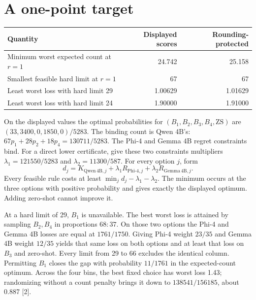 \documentclass[11pt]{article}
\begin{document}
\newpage
\section{A one-point target}
\begin{center}\small
\begin{tabular}{lrr}
\toprule
Quantity & Displayed scores & Rounding-protected\\\midrule
Minimum worst expected count at $r=1$ & 24.742 & 25.158\\
Smallest feasible hard limit at $r=1$ & 67 & 67\\
Least worst loss with hard limit 29 & 1.00629 & 1.01629\\
Least worst loss with hard limit 24 & 1.90000 & 1.91000\\
\bottomrule
\end{tabular}
\end{center}
On the displayed values the optimal probabilities for $(B_1,B_2,B_3,B_4,\mathrm{ZS})$ are $(33,3400,0,1850,0)/5283$. The binding count is Qwen 4B's: $67p_1+28p_2+18p_4=130711/5283$. The Phi-4 and Gemma 4B regret constraints bind. For a direct lower certificate, give these two constraints multipliers $\lambda_1=121550/5283$ and $\lambda_2=11300/587$. For every option $j$, form
\[
 d_j=K_{\mathrm{Qwen\,4B},j}+\lambda_1 R_{\mathrm{Phi\text{-}4},j}
                              +\lambda_2 R_{\mathrm{Gemma\,4B},j}.
\]
Every feasible rule costs at least $\min_j d_j-\lambda_1-\lambda_2$. The minimum occurs at the three options with positive probability and gives exactly the displayed optimum. Adding zero-shot cannot improve it.

At a hard limit of 29, $B_1$ is unavailable. The best worst loss is attained by sampling $B_2,B_4$ in proportions $68:37$. On those two options the Phi-4 and Gemma 4B losses are equal at $1761/1750$. Giving Phi-4 weight $23/35$ and Gemma 4B weight $12/35$ yields that same loss on both options and at least that loss on $B_3$ and zero-shot. Every limit from 29 to 66 excludes the identical column. Permitting $B_1$ closes the gap with probability $11/1761$ in the expected-count optimum. Across the four bins, the best fixed choice has worst loss 1.43; randomizing without a count penalty brings it down to $138541/156185$, about 0.887 [2].
\end{document}
